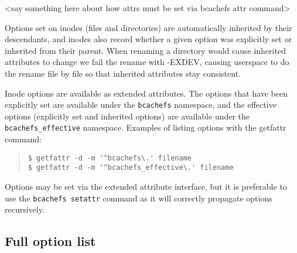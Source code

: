 \documentclass{article}
\begin{document}
<say something here about how attrs must be set via bcachefs attr command>

Options set on inodes (files and directories) are automatically inherited by
their descendants, and inodes also record whether a given option was explicitly
set or inherited from their parent. When renaming a directory would cause
inherited attributes to change we fail the rename with -EXDEV, causing userspace
to do the rename file by file so that inherited attributes stay consistent.

Inode options are available as extended attributes. The options that have been
explicitly set are available under the \texttt{bcachefs} namespace, and the effective
options (explicitly set and inherited options) are available under the
\texttt{bcachefs\_effective} namespace. Examples of listing options with the
getfattr command:

\begin{quote} \begin{verbatim}
$ getfattr -d -m '^bcachefs\.' filename
$ getfattr -d -m '^bcachefs_effective\.' filename
\end{verbatim} \end{quote}

Options may be set via the extended attribute interface, but it is preferable to
use the \texttt{bcachefs setattr} command as it will correctly propagate options
recursively.

\subsection{Full option list}
\end{document}
